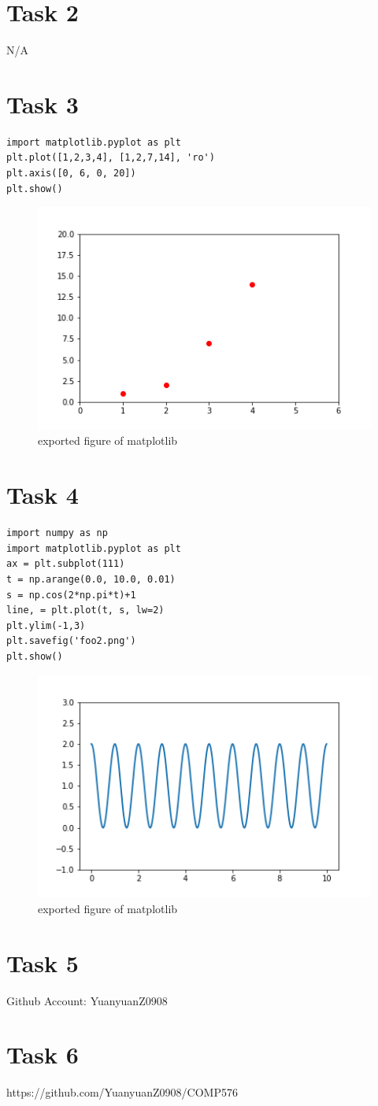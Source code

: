 \documentclass[paper=a4, fontsize=11pt]{scrartcl} %
\numberwithin{equation}{section} %
\numberwithin{figure}{section} %
\numberwithin{table}{section} %
\begin{document}
\section{Task 2}
N/A

\section{Task 3}
\begin{verbatim}
import matplotlib.pyplot as plt
plt.plot([1,2,3,4], [1,2,7,14], 'ro')
plt.axis([0, 6, 0, 20])
plt.show()
\end{verbatim}
\begin{figure}[H]
 	\centering
 	\includegraphics[scale=0.75]{./../foo1.png}
 	\caption{exported figure of matplotlib}
 	\label{fig:matplotlib_output}
\end{figure}

\section{Task 4}
\begin{verbatim}
import numpy as np
import matplotlib.pyplot as plt
ax = plt.subplot(111)
t = np.arange(0.0, 10.0, 0.01)
s = np.cos(2*np.pi*t)+1
line, = plt.plot(t, s, lw=2)
plt.ylim(-1,3)
plt.savefig('foo2.png')
plt.show()
\end{verbatim}
\begin{figure}[H]
 	\centering
 	\includegraphics[scale=0.75]{./../foo2.png}
 	\caption{exported figure of matplotlib}
 	\label{fig:matplotlib_output}
\end{figure}

\section{Task 5}
Github Account: YuanyuanZ0908

\section{Task 6}
https://github.com/YuanyuanZ0908/COMP576
\end{document}
